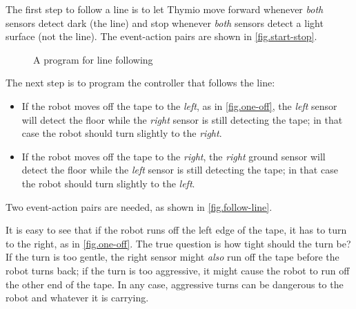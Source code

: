 The first step to follow a line is to let Thymio move forward whenever \emph{both} sensors detect dark (the line) and stop whenever \emph{both} sensors detect a light surface (not the line).
The event-action pairs are shown in \cref{fig.start-stop}.



\begin{figure}
	\hfill
	\caption{A program for line following}
\end{figure}


The next step is to program the controller that follows the line:
\begin{itemize}

\item If the robot moves off the tape to the \emph{left}, as in \cref{fig.one-off}, the
\emph{left} sensor will detect the floor while the \emph{right} sensor
is still detecting the tape; in that case the robot should turn slightly
to the \emph{right}.

\item If the robot moves off the tape to the \emph{right}, the
\emph{right} ground sensor will detect the floor while the \emph{left}
sensor is still detecting the tape; in that case the robot should turn
slightly to the \emph{left}.

\end{itemize}

Two event-action pairs are needed, as shown in \cref{fig.follow-line}.


It is easy to see that if the robot runs off the left edge of the tape, it has to turn to the right, as in \cref{fig.one-off}.
The true question is how tight should the turn be?
If the turn is too gentle, the right
sensor might \emph{also} run off the tape before the robot turns back;
if the turn is too aggressive, it might cause the robot to run off the
other end of the tape. In any case, aggressive turns can be dangerous to
the robot and whatever it is carrying.

